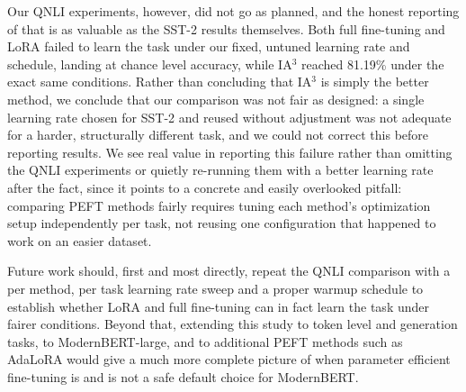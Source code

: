 \documentclass[11pt]{article}
\begin{document}
Our QNLI experiments, however, did not go as planned, and the
honest reporting of that is as valuable as the SST-2 results
themselves. Both full fine-tuning and LoRA failed to learn the task
under our fixed, untuned learning rate and schedule, landing at
chance level accuracy, while IA$^3$ reached 81.19\% under the exact same
conditions. Rather than concluding that IA$^3$ is simply the better
method, we conclude that our comparison was not fair as designed: a
single learning rate chosen for SST-2 and reused without adjustment was
not adequate for a harder, structurally different task, and we could not correct this before reporting
results. We see real value in reporting this failure rather than
omitting the QNLI experiments or quietly re-running them with a better
learning rate after the fact, since it points to a concrete and easily
overlooked pitfall: comparing PEFT methods fairly requires tuning each
method's optimization setup independently per task, not reusing one
configuration that happened to work on an easier dataset.

Future work should, first and most directly, repeat the QNLI comparison
with a per method, per task learning rate sweep and a proper warmup
schedule to establish whether LoRA and full fine-tuning can in fact
learn the task under fairer conditions. Beyond that, extending this
study to token level and generation tasks, to ModernBERT-large, and to
additional PEFT methods such as AdaLoRA would give a much more complete
picture of when parameter efficient fine-tuning is and is not a safe
default choice for ModernBERT.



\end{document}
